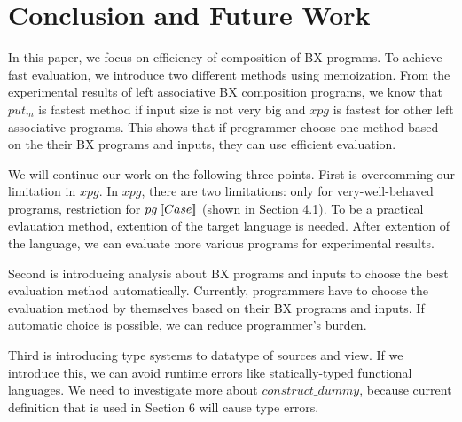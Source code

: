 \section{Conclusion and Future Work}

In this paper, we focus on efficiency of composition of BX programs.
To achieve fast evaluation, we introduce two different methods using memoization.
From the experimental results of left associative BX composition programs, we know that $put_m$ is fastest method if input size is not very big and $xpg$ is fastest for other left associative programs.
This shows that if programmer choose one method based on the their BX programs and inputs, they can use efficient evaluation. 


We will continue our work on the following three points.
First is overcomming our limitation in $xpg$. In $xpg$, there are two limitations: only for very-well-behaved programs, restriction for $pg \, [\![Case]\!]$ (shown in Section 4.1). To be a practical evlauation method, extention of the target language is needed. After extention of the language, we can evaluate more various programs for experimental results.

Second is introducing analysis about BX programs and inputs to choose the best evaluation method automatically.
Currently, programmers have to choose the evaluation method by themselves based on their BX programs and inputs. If automatic choice is possible, we can reduce programmer's burden.

Third is introducing type systems to datatype of sources and view. If we introduce this, we can avoid runtime errors like statically-typed functional languages. We need to investigate more about $construct\_dummy$, because current definition that is used in Section 6 will cause type errors. 





